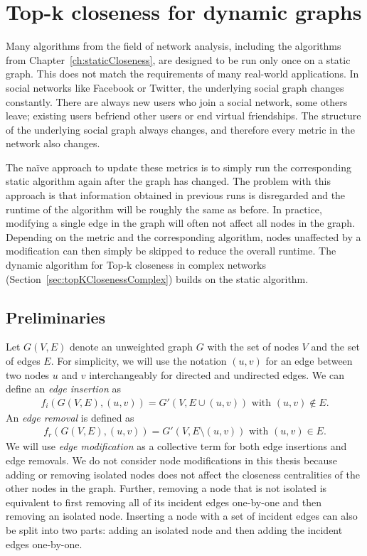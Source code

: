 \chapter{Top-k closeness for dynamic graphs}
\label{ch:dynamicCloseness}

Many algorithms from the field of network analysis, including the algorithms from Chapter~\ref{ch:staticCloseness}, are designed to be run only once on a static graph. This does not match the requirements of many real-world applications. In social networks like Facebook or Twitter, the underlying social graph changes constantly. There are always new users who join a social network, some others leave; existing users befriend other users or end virtual friendships. The structure of the underlying social graph always changes, and therefore every metric in the network also changes.

The na\"ive approach to update these metrics is to simply run the corresponding static algorithm again after the graph has changed. The problem with this approach is that information obtained in previous runs is disregarded and the runtime of the algorithm will be roughly the same as before. In practice, modifying a single edge in the graph will often not affect all nodes in the graph. Depending on the metric and the corresponding algorithm, nodes unaffected by a modification can then simply be skipped to reduce the overall runtime. The dynamic algorithm for Top-k closeness in complex networks (Section~\ref{sec:topKClosenessComplex}) builds on the static algorithm. 

\section{Preliminaries}
Let $G(V, E)$ denote an unweighted graph $G$ with the set of nodes $V$ and the set of edges $E$. For simplicity, we will use the notation $(u, v)$ for an edge between two nodes $u$ and $v$ interchangeably for directed and undirected edges. We can define an \emph{edge insertion} as
\begin{align}
	f_i(G(V, E), (u, v)) = G'(V, E \cup (u, v))\text{ with } (u, v) \notin E.
\end{align}
An \emph{edge removal} is defined as
\begin{align}
	f_r(G(V, E), (u, v)) = G'(V, E \setminus (u, v)) \text{ with } (u, v) \in E.
\end{align}
We will use \emph{edge modification} as a collective term for both edge insertions and edge removals. We do not consider node modifications in this thesis because adding or removing isolated nodes does not affect the closeness centralities of the other nodes in the graph. Further, removing a node that is not isolated is equivalent to first removing all of its incident edges one-by-one and then removing an isolated node. Inserting a node with a set of incident edges can also be split into two parts: adding an isolated node and then adding the incident edges one-by-one.

